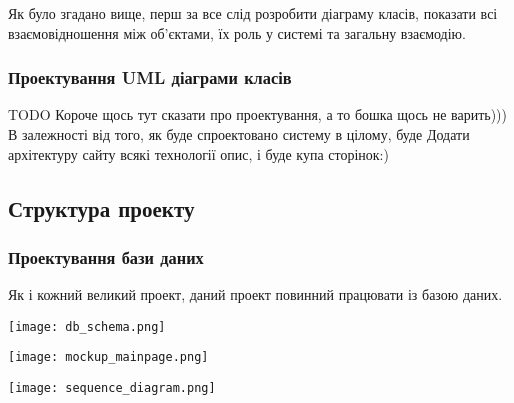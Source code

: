 \par Як було згадано вище, перш за все слід розробити діаграму класів, показати всі взаємовідношення між об'єктами, їх роль у системі та загальну взаємодію.
\subsubsection{Проектування UML діаграми класів}


TODO
Короче щось тут сказати про проектування, а то бошка щось не варить)))
В залежності від того, як буде спроектовано систему в цілому, буде
Додати архітектуру сайту
всякі технології опис, і буде купа сторінок:)
\subsection{Структура проекту}

\subsubsection{Проектування бази даних}
Як і кожний великий проект, даний проект повинний працювати із базою даних.

\begin{center}
		\texttt{[image: db\_schema.png]}
\end{center}


\begin{center}
		\texttt{[image: mockup\_mainpage.png]}
\end{center}


\begin{center}
		\texttt{[image: sequence\_diagram.png]}
\end{center}
